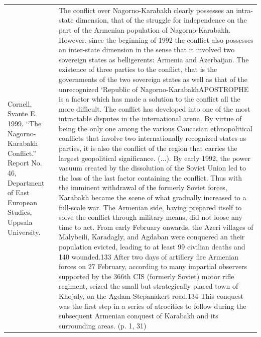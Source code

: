 {\begin{longtable}{p{}p{}}
\\
Cornell, Svante E. 1999. “The Nagorno-Karabakh Conflict.” Report No. 46, Department of East European Studies, Uppsala University. & The conflict over Nagorno-Karabakh clearly possesses an intra-state dimension, that of the struggle for independence on the part of the Armenian population of Nagorno-Karabakh. However, since the beginning of 1992 the conflict also possesses an inter-state dimension in the sense that it involved two sovereign states as belligerents: Armenia and Azerbaijan. The existence of three parties to the conflict, that is the governments of the two sovereign states as well as that of the unrecognized ‘Republic of Nagorno-KarabakhAPOSTROPHE is a factor which has made a solution to the conflict all the more difficult. The conflict has developed into one of the most intractable disputes in the international arena. By virtue of being the only one among the various Caucasian ethnopolitical conflicts that involve two internationally recognized states as parties, it is also the conflict of the region that carries the largest geopolitical significance. (...). By early 1992, the power vacuum created by the dissolution of the Soviet Union led to the loss of the last factor containing the conflict. Thus with the imminent withdrawal of the formerly Soviet forces, Karabakh became the scene of what gradually increased to a full-scale war. The Armenian side, having prepared itself to solve the conflict through military means, did not loose any time to act. From early February onwards, the Azeri villages of Malybeili, Karadagly, and Agdaban were conquered an their population evicted, leading to at least 99 civilian deaths and 140 wounded.133 After two days of artillery fire Armenian forces on 27 February, according to many impartial observers supported by the 366th CIS (formerly Soviet) motor rifle regiment, seized the small but strategically placed town of Khojaly, on the Agdam-Stepanakert road.134 This conquest was the first step in a series of atrocities to follow during the subsequent Armenian conquest of Karabakh and its surrounding areas. (p. 1, 31)
\\

\end{longtable}}
